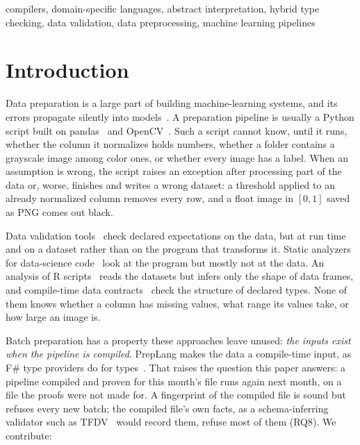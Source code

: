 \documentclass[conference]{IEEEtran}
\begin{document}
\begin{IEEEkeywords}
compilers, domain-specific languages, abstract interpretation, hybrid type checking, data
validation, data preprocessing, machine learning pipelines
\end{IEEEkeywords}

\section{Introduction}

Data preparation is a large part of building machine-learning systems, and its errors propagate
silently into models~\cite{sculley2015,polyzotis2018}. A preparation pipeline is usually a Python
script built on pandas~\cite{mckinney2010} and OpenCV~\cite{bradski2000}. Such a script cannot
know, until it runs, whether the column it normalizes holds numbers, whether a folder contains a
grayscale image among color ones, or whether every image has a label. When an assumption is wrong,
the script raises an exception after processing part of the data or, worse, finishes and writes a
wrong dataset: a threshold applied to an already normalized column removes every row, and a float
image in $[0,1]$ saved as PNG comes out black.

Data validation tools~\cite{breck2019,schelter2018,bantilan2020,gx} check declared expectations on
the data, but at run time and on a dataset rather than on the program that transforms it. Static
analyzers for data-science code~\cite{urban2019,subotic2022,lagouvardos2020,zhuang2022} look at the
program but mostly not at the data. An analysis of R scripts~\cite{gerstl2026} reads the datasets
but infers only the shape of data frames, and compile-time data contracts~\cite{mirji2026} check
the structure of declared types. None of them knows whether a column has missing values, what
range its values take, or how large an image is.

Batch preparation has a property these approaches leave unused: \emph{the inputs exist when the
pipeline is compiled}. PrepLang makes the data a compile-time input, as F\# type providers do for
types~\cite{petricek2016}. That raises the question this paper answers: a pipeline compiled and
proven for this month's file runs again next month, on a file the proofs were not made for. A
fingerprint of the compiled file is sound but refuses every new batch; the compiled file's own
facts, as a schema-inferring validator such as TFDV~\cite{breck2019} would record them, refuse most
of them (RQ8). We contribute:
\end{document}
